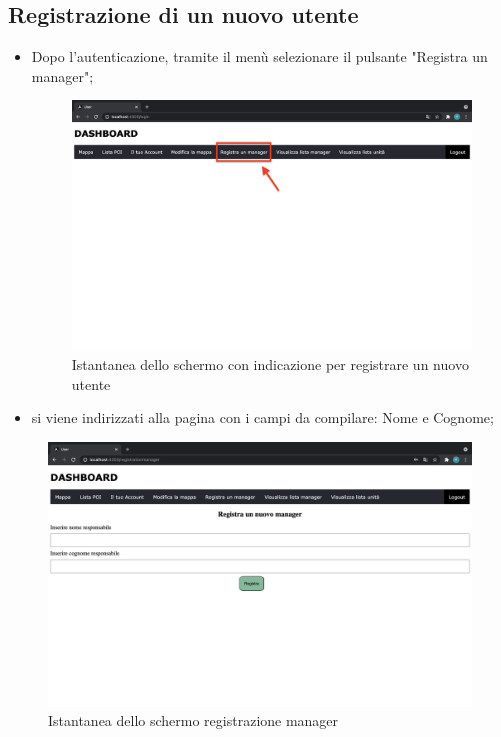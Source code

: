 \subsection{Registrazione di un nuovo utente}
\begin{itemize}
    \item Dopo l'autenticazione, tramite il menù selezionare il pulsante "Registra un manager";
    \begin{figure}[H]
        \centering
        \includegraphics[scale=0.12]{res/images/dashboard4.png}
        \caption{Istantanea dello schermo con indicazione per registrare un nuovo utente}
    \end{figure}
    \item si viene indirizzati alla pagina con i campi da compilare: Nome e Cognome;
\end{itemize}
\begin{figure}[H]
    \centering
    \includegraphics[scale=0.12]{res/images/newmanager.png}
    \caption{Istantanea dello schermo registrazione manager}
\end{figure}
